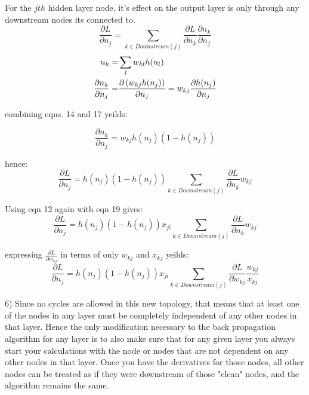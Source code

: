 \documentclass[12pt]{article}
\begin{document}
For the $jth$ hidden layer node, it's effect on the output layer is only through any downstream nodes its connected to. 
\begin{equation}
    \frac{\partial L}{\partial n_j} = \sum_{k \in Downstream(j)} \frac{\partial L}{\partial n_k}\frac{\partial n_k}{\partial n_j}
\end{equation}
\begin{align}
    n_k =& \sum_l w_{kl} h(n_l) \notag \\
    \frac{\partial n_k}{\partial n_j} =& \frac{\partial \left( w_{kj} h(n_j)\right)}{\partial n_j} = w_{kj}\frac{\partial h(n_j)}{\partial n_j}
\end{align}

combining eqns. 14 and 17 yeilds: 

\begin{equation}
    \frac{\partial n_k}{\partial n_j} = w_{kj}h(n_j)(1-h(n_j))
\end{equation}

hence:
\begin{equation}
    \frac{\partial L}{\partial n_j} = h(n_j)(1-h(n_j))\sum_{k \in Downstream(j)} \frac{\partial L}{\partial n_k}w_{kj}
\end{equation}

Using eqn 12 again with eqn 19 gives: 
\begin{equation}
    \frac{\partial L}{\partial n_j} = h(n_j)(1-h(n_j)) x_{ji} \sum_{k \in Downstream(j)} \frac{\partial L}{\partial n_k}w_{kj}
\end{equation}

expressing $\frac{\partial L}{\partial w_{kj}}$ in terms of only $w_{kj}$ and $x_{kj}$ yeilds: 
\begin{equation}
    \frac{\partial L}{\partial n_j} = h(n_j)(1-h(n_j)) x_{ji} \sum_{k \in Downstream(j)} \frac{\partial L}{\partial w_{kj}}\frac{w_{kj}}{x_{kj}}
\end{equation}

\pagebreak
\setcounter{equation}{0}
6) Since no cycles are allowed in this new topology, that means that at least one of the nodes in any layer must be
completely independent of any other nodes in that layer. Hence the only modification  necessary 
to the back propagation algorithm for any layer is to also make sure that for any given layer you always start your calculations
with the node or nodes that are not dependent on any other nodes in that layer. Once you have the derivatives for those nodes, 
all other nodes can be treated as if they were downstream of those "clean" nodes, and the algorithm remains the same. 
\end{document}
